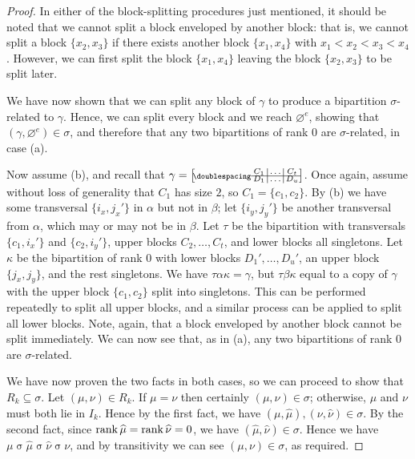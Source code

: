 \begin{lemma}
\begin{proof}
    In either of the block-splitting procedures just mentioned, it should be
    noted that we cannot split a block enveloped by another block: that is, we
    cannot split a block $\{x_2, x_3\}$ if there exists another block
    $\{x_1, x_4\}$ with $x_1 < x_2 < x_3 < x_4$.  However, we can first split
    the block $\{x_1, x_4\}$ leaving the block $\{x_2, x_3\}$ to be split later.

    We have now shown that we can split any block of $\gamma$ to produce a
    bipartition $\sigma$-related to $\gamma$.  Hence, we can split every block
    and we reach $\varnothing^e$, showing that
    $(\gamma, \varnothing^e) \in \sigma$, and therefore that any two bipartitions
    of rank 0 are $\sigma$-related, in case (a).

    Now assume (b), and recall that
    $\gamma = \bipart{c|c|c}{1-3}{C_1 & \ldots & C_t}{D_1 & \ldots & D_u}$.
    Once again, assume without loss of generality that $C_1$ has size $2$, so
    $C_1 = \{c_1, c_2\}$.  By (b) we have some transversal $\{i_x, j_x'\}$ in
    $\alpha$ but not in $\beta$; let $\{i_y, j_y'\}$ be another transversal from
    $\alpha$, which may or may not be in $\beta$.  Let $\tau$ be the bipartition
    with transversals $\{c_1, i_x'\}$ and $\{c_2, i_y'\}$, upper blocks
    $C_2, \ldots, C_t$, and lower blocks all singletons.  Let $\kappa$ be the
    bipartition of rank $0$ with lower blocks $D_1', \ldots, D_u'$, an upper
    block $\{j_x, j_y\}$, and the rest singletons.  We have
    $\tau\alpha\kappa = \gamma$, but $\tau\beta\kappa$ equal to a copy of
    $\gamma$ with the upper block $\{c_1, c_2\}$ split into singletons.  This
    can be performed repeatedly to split all upper blocks, and a similar process
    can be applied to split all lower blocks.  Note, again, that a block
    enveloped by another block cannot be split immediately.  We can now see
    that, as in (a), any two bipartitions of rank $0$ are $\sigma$-related.

    We have now proven the two facts in both cases, so we can proceed to show
    that $R_k \subseteq \sigma$.  Let $(\mu, \nu) \in R_k$.  If $\mu=\nu$ then
    certainly $(\mu, \nu) \in \sigma$; otherwise, $\mu$ and $\nu$ must both lie
    in $I_k$.  Hence by the first fact, we have
    $(\mu, \widehat\mu), (\nu, \widehat\nu) \in \sigma$.  By the second fact,
    since $\operatorname{rank}\widehat\mu = \operatorname{rank}\widehat\nu = 0$, we have
    $(\widehat\mu, \widehat\nu) \in \sigma$.  Hence we have
    $\mu \mathrel\sigma \widehat\mu \mathrel\sigma \widehat\nu \mathrel\sigma
    \nu$, and by transitivity we can see $(\mu, \nu) \in \sigma$, as required.
  \end{proof}
\end{lemma}

